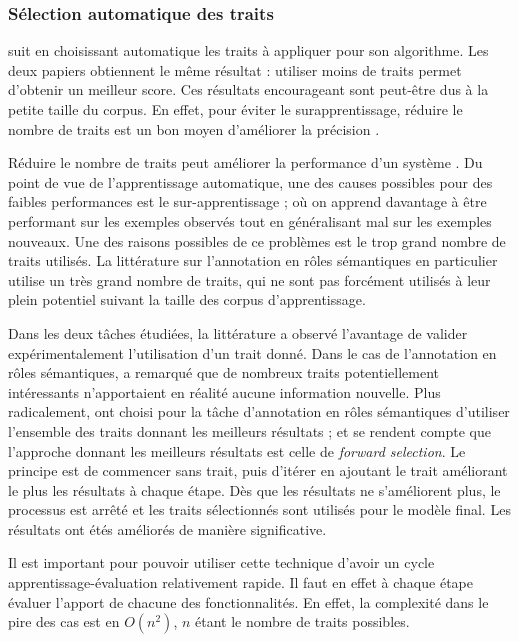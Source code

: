 \subsubsection{Sélection automatique des traits}

\cite{dinu2007sometimes} suit \cite{mihalcea2002instance} en choisissant
automatique les traits à appliquer pour son algorithme. Les deux papiers
obtiennent le même résultat : utiliser moins de traits permet d'obtenir un
meilleur score. Ces résultats encourageant sont peut-être dus à la petite
taille du corpus. En effet, pour éviter le surapprentissage, réduire le nombre
de traits est un bon moyen d'améliorer la précision \citep{van2004bias}.


Réduire le nombre de traits peut améliorer la performance d'un système
\cite{mihalcea2002instance,dinu2007sometimes}. Du point de vue de
l'apprentissage automatique, une des causes possibles pour des faibles
performances est le sur-apprentissage ; où on apprend davantage à être
performant sur les exemples observés tout en généralisant mal sur les exemples
nouveaux. Une des raisons possibles de ce problèmes est le trop grand nombre de
traits utilisés. La littérature sur l'annotation en rôles sémantiques en
particulier utilise un très grand nombre de traits, qui ne sont pas forcément
utilisés à leur plein potentiel suivant la taille des corpus d'apprentissage.

Dans les deux tâches étudiées, la littérature a observé l'avantage de valider
expérimentalement l'utilisation d'un trait donné. Dans le cas de l'annotation
en rôles sémantiques, \cite{xue2004calibrating} a remarqué que de nombreux
traits potentiellement intéressants n'apportaient en réalité aucune information
nouvelle. Plus radicalement, \cite{mihalcea2002instance,dinu2007sometimes} ont
choisi pour la tâche d'annotation en rôles sémantiques d'utiliser l'ensemble
des traits donnant les meilleurs résultats ; et se rendent compte que
l'approche donnant les meilleurs résultats est celle de \textit{forward
selection}. Le principe est de commencer sans trait, puis d'itérer en ajoutant
le trait améliorant le plus les résultats à chaque étape. Dès que les résultats
ne s'améliorent plus, le processus est arrêté et les traits sélectionnés sont
utilisés pour le modèle final. Les résultats ont étés améliorés de manière
significative.

Il est important pour pouvoir utiliser cette technique d'avoir un cycle
apprentissage-évaluation relativement rapide. Il faut en effet à chaque étape
évaluer l'apport de chacune des fonctionnalités. En effet, la complexité dans
le pire des cas est en $O(n^2)$, $n$ étant le nombre de traits possibles.


